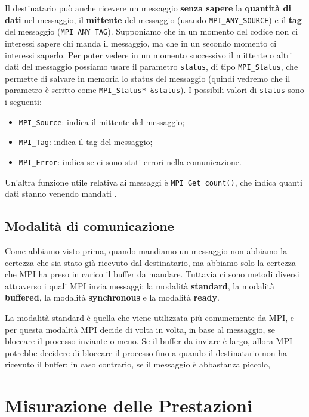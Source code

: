 Il destinatario può anche ricevere un messaggio \textbf{senza sapere} la \textbf{quantità di dati} nel messaggio, il \textbf{mittente} del messaggio (usando \verb|MPI_ANY_SOURCE|) e il \textbf{tag} del messaggio (\verb|MPI_ANY_TAG|).
\nwl
Supponiamo che in un momento del codice non ci interessi sapere chi manda il messaggio, ma che in un secondo momento ci interessi saperlo. Per poter vedere in un momento successivo il mittente o altri dati del messaggio possiamo usare il parametro \verb|status|, di tipo \verb|MPI_Status|, che permette di salvare in memoria lo status del messaggio (quindi vedremo che il parametro è scritto come \verb|MPI_Status* &status|). I possibili valori di \verb|status| sono i seguenti:
\begin{itemize}
    \item \verb|MPI_Source|: indica il mittente del messaggio;
    \item \verb|MPI_Tag|: indica il tag del messaggio;
    \item \verb|MPI_Error|: indica se ci sono stati errori nella comunicazione.
\end{itemize}

Un'altra funzione utile relativa ai messaggi è \verb|MPI_Get_count()|, che indica quanti dati stanno venendo mandati .

\subsection{Modalità di comunicazione}

Come abbiamo visto prima, quando mandiamo un messaggio non abbiamo la certezza che sia stato già ricevuto dal destinatario, ma abbiamo solo la certezza che MPI ha preso in carico il buffer da mandare. Tuttavia ci sono metodi diversi attraverso i quali MPI invia messaggi: la modalità \textbf{standard}, la modalità \textbf{buffered}, la modalità \textbf{synchronous} e la modalità \textbf{ready}.

La modalità standard è quella che viene utilizzata più comunemente da MPI, e per questa modalità MPI decide di volta in volta, in base al messaggio, se bloccare il processo inviante o meno. Se il buffer da inviare è largo, allora MPI potrebbe decidere di bloccare il processo fino a quando il destinatario non ha ricevuto il buffer; in caso contrario, se il messaggio è abbastanza piccolo, 

\section{Misurazione delle Prestazioni}


